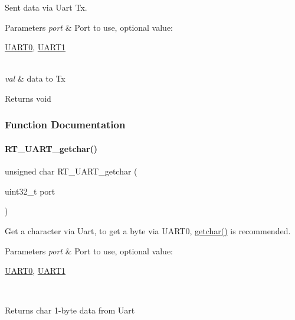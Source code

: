 Sent data via Uart Tx. 


\begin{DoxyParams}{Parameters}
{\em port} & Port to use, optional value\+:
\begin{DoxyCode}
\mbox{\hyperlink{a00173_a0508661f121639ffdee7de2353a0def2}{UART0}}, \mbox{\hyperlink{a00173_a8d69bf04d07af4fbbab5a8bd291f65ff}{UART1}}
\end{DoxyCode}
 \\
\hline
{\em val} & data to Tx \\
\hline
\end{DoxyParams}
\begin{DoxyReturn}{Returns}
void 
\end{DoxyReturn}


\subsubsection{Function Documentation}
\mbox{\label{a00173_abc136df9d66fe27bf8ffcc319246591e}} 
\paragraph{\texorpdfstring{R\+T\+\_\+\+U\+A\+R\+T\+\_\+getchar()}{RT\_UART\_getchar()}}
{\footnotesize\ttfamily unsigned char R\+T\+\_\+\+U\+A\+R\+T\+\_\+getchar (\begin{DoxyParamCaption}\item[{uint32\+\_\+t}]{port }\end{DoxyParamCaption})}



Get a character via Uart, to get a byte via U\+A\+R\+T0, \mbox{\hyperlink{a00095_a0979671914792955a7a68461634ff82d}{getchar()}} is recommended. 


\begin{DoxyParams}{Parameters}
{\em port} & Port to use, optional value\+:
\begin{DoxyCode}
\mbox{\hyperlink{a00173_a0508661f121639ffdee7de2353a0def2}{UART0}}, \mbox{\hyperlink{a00173_a8d69bf04d07af4fbbab5a8bd291f65ff}{UART1}}
\end{DoxyCode}
 \\
\hline
\end{DoxyParams}
\begin{DoxyReturn}{Returns}
char 1-\/byte data from Uart 
\end{DoxyReturn}
\mbox{\label{a00173_ab0faf051e642e540b1b9c114eae242bd}} 
